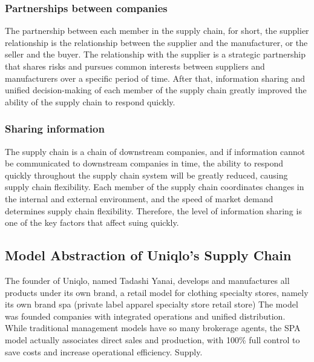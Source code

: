 \documentclass[12pt,a4paper]{article}
\begin{document}
\hypertarget{partnerships-between-companies}{%
\subsubsection{Partnerships between
companies}\label{partnerships-between-companies}}

The partnership between each member in the supply chain, for short, the
supplier relationship is the relationship between the supplier and the
manufacturer, or the seller and the buyer. The relationship with the
supplier is a strategic partnership that shares risks and pursues common
interests between suppliers and manufacturers over a specific period of
time. After that, information sharing and unified decision-making of
each member of the supply chain greatly improved the ability of the
supply chain to respond quickly.

\hypertarget{sharing-information}{%
\subsubsection{Sharing information}\label{sharing-information}}

The supply chain is a chain of downstream companies, and if information
cannot be communicated to downstream companies in time, the ability to
respond quickly throughout the supply chain system will be greatly
reduced, causing supply chain flexibility. Each member of the supply
chain coordinates changes in the internal and external environment, and
the speed of market demand determines supply chain flexibility.
Therefore, the level of information sharing is one of the key factors
that affect suing quickly.

\hypertarget{model-abstraction-of-uniqlos-supply-chain}{%
\subsection{Model Abstraction of Uniqlo's Supply
Chain}\label{model-abstraction-of-uniqlos-supply-chain}}

The founder of Uniqlo, named Tadashi Yanai, develops and manufactures
all products under its own brand, a retail model for clothing specialty
stores, namely its own brand spa (private label apparel specialty store
retail store) The model was founded companies with integrated operations
and unified distribution. While traditional management models have so
many brokerage agents, the SPA model actually associates direct sales
and production, with 100\% full control to save costs and increase
operational efficiency. Supply.
\end{document}
